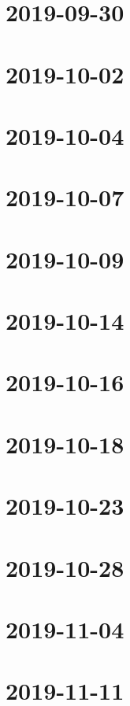 \documentclass{book}
\begin{document}
\chapter{2019-09-30}
 

\chapter{2019-10-02}


\chapter{2019-10-04}


\chapter{2019-10-07}


\chapter{2019-10-09}


\chapter{2019-10-14}


\chapter{2019-10-16}


\chapter{2019-10-18}


\chapter{2019-10-23}


\chapter{2019-10-28}


\chapter{2019-11-04}


\chapter{}


\chapter{2019-11-11}

\end{document}
